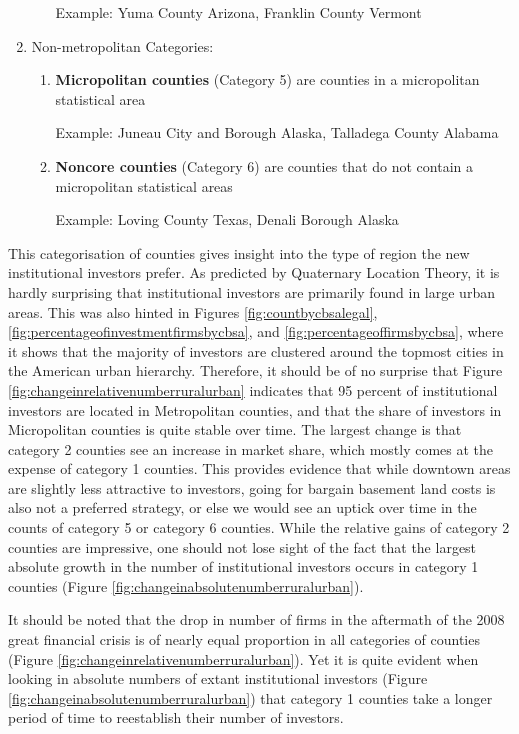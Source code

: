 \begin{enumerate}
\begin{enumerate}
		Example: Yuma County Arizona, Franklin County Vermont
		
	\end{enumerate}
	\item	Non-metropolitan Categories:
	\begin{enumerate}
		\item \textbf{Micropolitan counties} (Category 5) are counties in a micropolitan statistical area
		
		Example:  Juneau City and Borough Alaska, Talladega County Alabama
		
		\item \textbf{Noncore counties} (Category 6) are counties that do not contain a micropolitan statistical areas
		
		Example: Loving County Texas, Denali Borough Alaska
	\end{enumerate}
\end{enumerate}


This categorisation of counties gives insight into the type of region the new institutional investors prefer. As predicted by Quaternary Location Theory, it is hardly surprising that institutional investors are primarily found in large urban areas. This was also hinted in Figures \ref{fig:countbycbsalegal},  \ref{fig:percentageofinvestmentfirmsbycbsa}, and \ref{fig:percentageoffirmsbycbsa}, where it shows that the majority of investors are clustered around the topmost cities in the American urban hierarchy.  Therefore, it should be of no surprise that Figure \ref{fig:changeinrelativenumberruralurban} indicates that 95 percent of institutional investors are located in Metropolitan counties, and that the share of investors in Micropolitan counties is quite stable over time.  The largest change is that category 2 counties see an increase in market share, which mostly comes at the expense of category 1 counties. This provides evidence that while downtown areas are slightly less attractive to investors, going for bargain basement land costs is also not a preferred strategy, or else we would see an uptick over time in the counts of category 5 or category 6 counties.  While the relative gains of category 2 counties are impressive, one should not lose sight of the fact that the largest absolute growth in the number of institutional investors occurs in category 1 counties (Figure \ref{fig:changeinabsolutenumberruralurban}).     

It should be noted that the drop in number of firms in the aftermath of the 2008 great financial crisis is of nearly equal proportion in all categories of counties (Figure \ref{fig:changeinrelativenumberruralurban}).  Yet it is quite evident when looking in absolute numbers of extant institutional investors (Figure \ref{fig:changeinabsolutenumberruralurban}) that category 1 counties take a longer period of time to reestablish their number of investors.  

